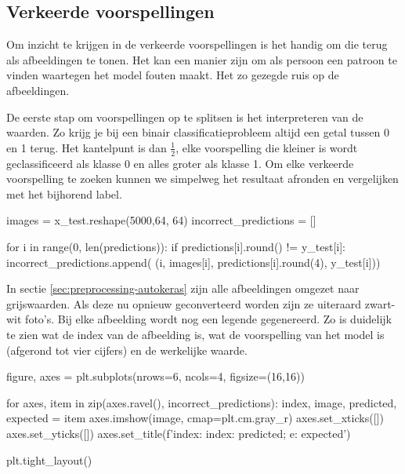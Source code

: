 \subsection{Verkeerde voorspellingen}
\label{subsec:wrong-predictions}

Om inzicht te krijgen in de verkeerde voorspellingen is het handig om die terug als afbeeldingen te tonen. Het kan een manier zijn om als persoon een patroon te vinden waartegen het model fouten maakt. Het zo gezegde ruis op de afbeeldingen. 

De eerste stap om voorspellingen op te splitsen is het interpreteren van de waarden. Zo krijg je bij een binair classificatieprobleem altijd een getal tussen 0 en 1 terug. Het kantelpunt is dan $\frac{1}{2}$, elke voorspelling die kleiner is wordt geclassificeerd als klasse 0 en alles groter als klasse 1. Om elke verkeerde voorspelling te zoeken kunnen we simpelweg het resultaat afronden en vergelijken met het bijhorend label.

\bigskip

\begin{python}
images = x_test.reshape(5000,64, 64)
incorrect_predictions = []

for i in range(0, len(predictions)):
    if predictions[i].round() != y_test[i]:
        incorrect_predictions.append(
            (i, images[i], predictions[i].round(4), y_test[i]))
\end{python}

In sectie \ref{sec:preprocessing-autokeras} zijn alle afbeeldingen omgezet naar grijswaarden. Als deze nu opnieuw geconverteerd worden zijn ze uiteraard zwart-wit foto's. Bij elke afbeelding wordt nog een legende gegenereerd. Zo is duidelijk te zien wat de index van de afbeelding is, wat de voorspelling van het model is (afgerond tot vier cijfers) en de werkelijke waarde.

\bigskip

\begin{python}

figure, axes = plt.subplots(nrows=6, ncols=4, figsize=(16,16))

for axes, item in zip(axes.ravel(), incorrect_predictions):
    index, image, predicted, expected = item
    axes.imshow(image, cmap=plt.cm.gray_r)
    axes.set_xticks([])
    axes.set_yticks([])
    axes.set_title(f'index: {index}\np: {predicted}; e: {expected}')
    
plt.tight_layout()
\end{python}


